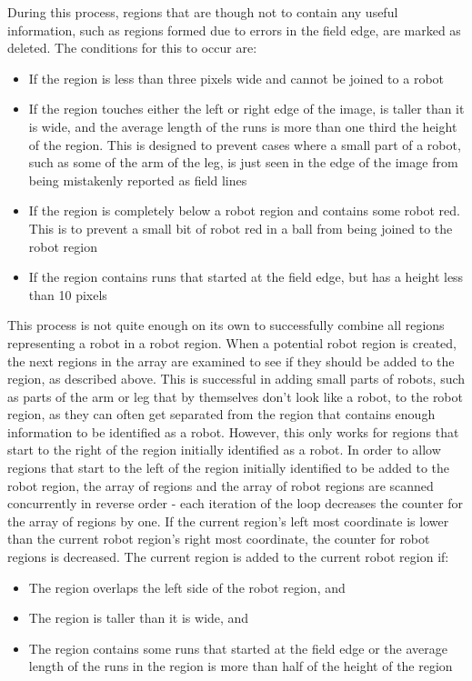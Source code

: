 \documentclass[pdftex,11pt,a4paper]{report}
\begin{document}
During this process, regions that are though not to contain any useful information, such as regions formed due to errors in the field edge, are marked as deleted. The conditions for this to occur are: \begin{itemize}
\item{If the region is less than three pixels wide and cannot be joined to a robot}
\item{If the region touches either the left or right edge of the image, is taller than it is wide, and the average length of the runs is more than one third the height of the region. This is designed to prevent cases where a small part of a robot, such as some of the arm of the leg, is just seen in the edge of the image from being mistakenly reported as field lines}
\item{If the region is completely below a robot region and contains some robot red. This is to prevent a small bit of robot red in a ball from being joined to the robot region}
\item{If the region contains runs that started at the field edge, but has a height less than 10 pixels}
\end{itemize}
This process is not quite enough on its own to successfully combine all regions representing a robot in a robot region. When a potential robot region is created, the next regions in the array are examined to see if they should be added to the region, as described above. This is successful in adding small parts of robots, such as parts of the arm or leg that by themselves don't look like a robot, to the robot region, as they can often get separated from the region that contains enough information to be identified as a robot. However, this only works for regions that start to the right of the region initially identified as a robot. In order to allow regions that start to the left of the region initially identified to be added to the robot region, the array of regions and the array of robot regions are scanned concurrently in reverse order - each iteration of the loop decreases the counter for the array of regions by one. If the current region's left most coordinate is lower than the current robot region's right most coordinate, the counter for robot regions is decreased. The current region is added to the current robot region if: \begin{itemize}
\item{The region overlaps the left side of the robot region, and}
\item{The region is taller than it is wide, and}
\item{The region contains some runs that started at the field edge or the average length of the runs in the region is more than half of the height of the region}
\end{itemize}
\end{document}
